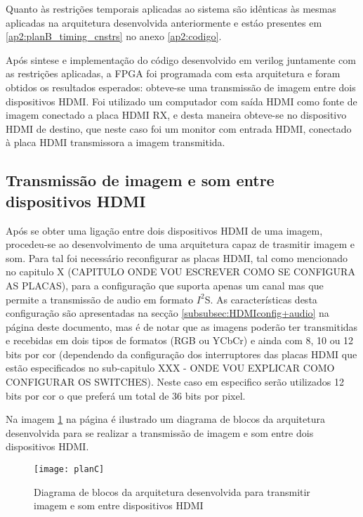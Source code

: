 Quanto às restrições temporais aplicadas ao sistema são idênticas às mesmas aplicadas na arquitetura desenvolvida anteriormente e estáo presentes em \ref{ap2:planB_timing_cnstrs} no anexo \ref{ap2:codigo}.

Após sintese e implementação do código desenvolvido em verilog juntamente com as restrições aplicadas, a FPGA foi programada com esta arquitetura e foram obtidos os resultados esperados: obteve-se uma transmissão de imagem entre dois dispositivos HDMI. Foi utilizado um computador com saída HDMI como fonte de imagem conectado a placa HDMI RX, e desta maneira obteve-se no dispositivo HDMI de destino, que neste caso foi um monitor com entrada HDMI, conectado à placa HDMI transmissora a imagem transmitida.


\subsection{Transmissão de imagem e som entre dispositivos HDMI}

Após se obter uma ligação entre dois dispositivos HDMI de uma imagem, procedeu-se ao desenvolvimento de uma arquitetura capaz de trasmitir imagem e som. Para tal foi necessário reconfigurar as placas HDMI, tal como mencionado no capitulo X (CAPITULO ONDE VOU ESCREVER COMO SE CONFIGURA AS PLACAS), para a configuração que suporta apenas um canal mas que permite a transmissão de audio em formato $I^{2}$S. As características desta configuração são apresentadas na secção \ref{subsubsec:HDMIconfig+audio} na página \pageref{subsubsec:HDMIconfig+audio} deste documento, mas é de notar que as imagens poderão ter transmitidas e recebidas em dois tipos de formatos (RGB ou YCbCr) e ainda com 8, 10 ou 12 bits por cor (dependendo da configuração dos interruptores das placas HDMI que estão especificados no sub-capitulo XXX - ONDE VOU EXPLICAR COMO CONFIGURAR OS SWITCHES). Neste caso em especifico serão utilizados 12 bits por cor o que preferá um total de 36 bits por pixel.

Na imagem \ref{fig:planC} na página \pageref{fig:planC} é ilustrado um diagrama de blocos da arquitetura desenvolvida para se realizar a transmissão de imagem e som entre dois dispositivos HDMI. 

\begin{figure}[h!]
	\begin{center}
		\leavevmode
		\texttt{[image: planC]}
		\caption{Diagrama de blocos da arquitetura desenvolvida para transmitir imagem e som entre dispositivos HDMI}
		\label{fig:planC}
	\end{center}
\end{figure}

